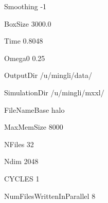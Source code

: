Smoothing -1

BoxSize 3000.0

Time    0.8048

Omega0  0.25

OutputDir /u/mingli/data/

SimulationDir /u/mingli/mxxl/

FileNameBase halo

MaxMemSize 8000

NFiles 32

Ndim   2048

CYCLES 1

NumFilesWrittenInParallel 8

